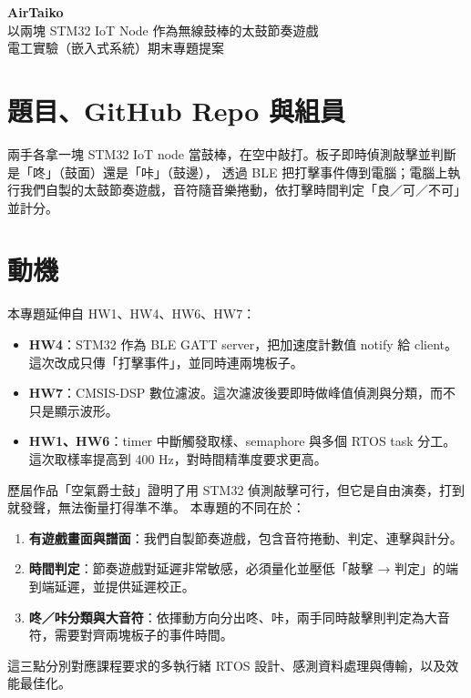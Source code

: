 \documentclass[12pt]{extarticle}
\begin{document}
\begin{center}
{\LARGE\bfseries AirTaiko}\\[0.4em]
{\large 以兩塊 STM32 IoT Node 作為無線鼓棒的太鼓節奏遊戲}\\[0.6em]
{\small 電工實驗（嵌入式系統）期末專題提案}
\end{center}

\section{題目、GitHub Repo 與組員}

兩手各拿一塊 STM32 IoT node 當鼓棒，在空中敲打。板子即時偵測敲擊並判斷是「咚」（鼓面）還是「咔」（鼓邊），
透過 BLE 把打擊事件傳到電腦；電腦上執行我們自製的太鼓節奏遊戲，音符隨音樂捲動，依打擊時間判定「良／可／不可」並計分。


\section{動機}

本專題延伸自 HW1、HW4、HW6、HW7：
\begin{itemize}
  \item \textbf{HW4}：STM32 作為 BLE GATT server，把加速度計數值 notify 給 client。這次改成只傳「打擊事件」，並同時連兩塊板子。
  \item \textbf{HW7}：CMSIS-DSP 數位濾波。這次濾波後要即時做峰值偵測與分類，而不只是顯示波形。
  \item \textbf{HW1、HW6}：timer 中斷觸發取樣、semaphore 與多個 RTOS task 分工。這次取樣率提高到 400 Hz，對時間精準度要求更高。
\end{itemize}

歷屆作品「空氣爵士鼓」證明了用 STM32 偵測敲擊可行，但它是自由演奏，打到就發聲，無法衡量打得準不準。
本專題的不同在於：
\begin{enumerate}
  \item \textbf{有遊戲畫面與譜面}：我們自製節奏遊戲，包含音符捲動、判定、連擊與計分。
  \item \textbf{時間判定}：節奏遊戲對延遲非常敏感，必須量化並壓低「敲擊 → 判定」的端到端延遲，並提供延遲校正。
  \item \textbf{咚／咔分類與大音符}：依揮動方向分出咚、咔，兩手同時敲擊則判定為大音符，需要對齊兩塊板子的事件時間。
\end{enumerate}
這三點分別對應課程要求的多執行緒 RTOS 設計、感測資料處理與傳輸，以及效能最佳化。
\end{document}
